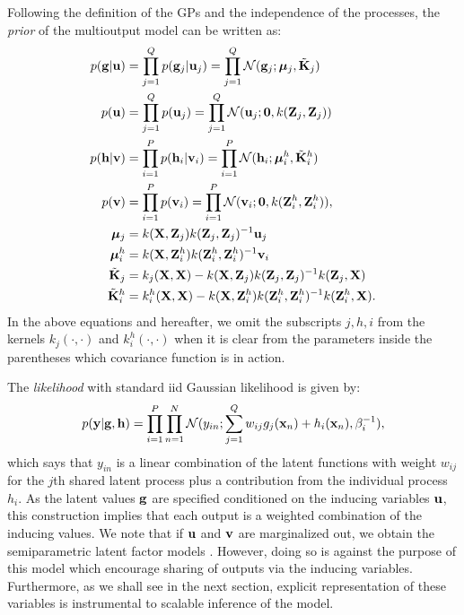 Following the definition of the GPs and the independence of the processes, the \emph{prior} of the multioutput model can be written as:
\begin{align}
\label{eq:gu}
p(\mathbf{g} | \mathbf{u}) &= \prod_{j=1}^Q p(\mathbf{g}_j | \mathbf{u}_j) = \prod_{j=1}^Q \mathcal{N}(\mathbf{g}_j; \boldsymbol{\mu}_j, \tilde{\mathbf{K}}_j )\\
p(\mathbf{u}) &= \prod_{j=1}^Q p(\mathbf{u}_j) = \prod_{j=1}^Q \mathcal{N}(\mathbf{u}_j; \mathbf{0}, k(\mathbf{Z}_j, \mathbf{Z}_j)) \\
\label{eq:hv}
p(\mathbf{h} | \mathbf{v}) &= \prod_{i=1}^P p(\mathbf{h}_i | \mathbf{v}_i) = \prod_{i=1}^P \mathcal{N}(\mathbf{h}_i; \boldsymbol{\mu}^h_i, \tilde{\mathbf{K}}^h_i)\\
p(\mathbf{v}) &= \prod_{i=1}^P p(\mathbf{v}_i) = \prod_{i=1}^P \mathcal{N}(\mathbf{v}_i; \mathbf{0}, k(\mathbf{Z}^h_i, \mathbf{Z}^h_i)), \\
 \boldsymbol{\mu}_j &= k(\mathbf{X},\mathbf{Z}_j)k(\mathbf{Z}_j,\mathbf{Z}_j)^{-1}\mathbf{u}_j \\
\boldsymbol{\mu}^h_i &= k(\mathbf{X},\mathbf{Z}^h_i)k(\mathbf{Z}^h_i,\mathbf{Z}^h_i)^{-1}\mathbf{v}_i \\
\tilde{\mathbf{K}}_j &= k_j(\mathbf{X},\mathbf{X}) - k(\mathbf{X},\mathbf{Z}_j)k(\mathbf{Z}_j,\mathbf{Z}_j)^{-1}k(\mathbf{Z}_j,\mathbf{X}) \\
\tilde{\mathbf{K}}^h_i &= k^h_i(\mathbf{X},\mathbf{X}) - k(\mathbf{X},\mathbf{Z}^h_i)k(\mathbf{Z}^h_i,\mathbf{Z}^h_i)^{-1}k(\mathbf{Z}^h_i,\mathbf{X}).
\end{align}
In the above equations and hereafter, we omit the subscripts $j,h,i$ from the kernels $k_j(\cdot,\cdot)$ and $k^h_i(\cdot,\cdot)$ when it is clear from the parameters inside the parentheses which covariance function is in action. 

The \emph{likelihood} with standard iid Gaussian likelihood is given by:
\begin{align}
p(\mathbf{y} | \mathbf{g}, \mathbf{h} ) = \prod_{i=1}^P \prod_{n=1}^N \mathcal{N}( y_{in} ; \sum_{j=1}^Q w_{ij} g_j(\mathbf{x}_n) + h_i(\mathbf{x}_n), \beta_i^{-1}),
\end{align}
which says that $y_{in}$ is a linear combination of the latent functions with weight $w_{ij}$ for the $j$th shared latent process plus a contribution from the individual process $h_i$.
As the latent values $\mathbf{g}$ are specified conditioned on the inducing variables $\mathbf{u}$, this construction implies that each output is a weighted combination of the inducing values.
We note that if $\mathbf{u}$ and $\mathbf{v}$ are marginalized out, we obtain the semiparametric latent factor models \citep{teh-et-al-aistats-05}.
However, doing so is against the purpose of this model which encourage sharing of outputs via the inducing variables.
Furthermore, as we shall see in the next section, explicit representation of these variables is instrumental to scalable inference of the model.


